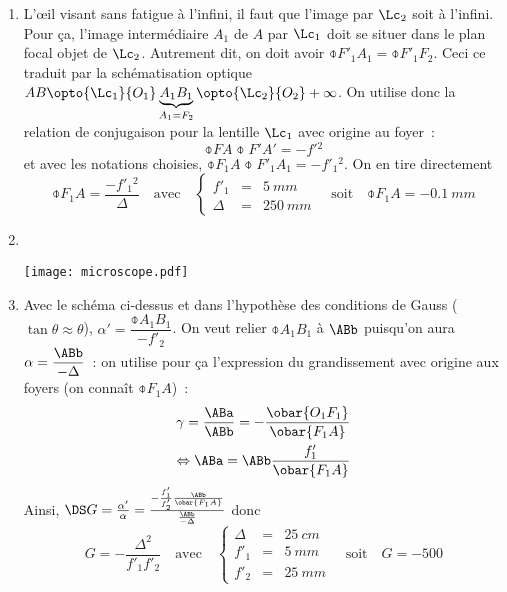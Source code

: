 \documentclass[a4paper, 12pt, final, garamond]{book}
\begin{document}
\begin{enumerate}
    \item L'œil visant sans fatigue à l'infini, il faut que l'image par $\Lc_2$
        soit à l'infini. Pour ça, l'image intermédiaire $A_1$ de $A$ par $\Lc_1$
        doit se situer dans le plan focal objet de $\Lc_2$. Autrement dit, on
        doit avoir $\obar{F'_1A_1} = \obar{F'_1F_2}$. Ceci ce traduit par la
        schématisation optique $AB \opto{\Lc_1}{O_1} \underbrace{A_1B_1}_{A_1 =
        F_2}\opto{\Lc_2}{O_2}
        +\infty$. On utilise donc la relation de conjugaison pour la lentille
        $\Lc_1$ avec origine au foyer~:
        \begin{equation*}
            \obar{FA}\obar{F'A'} = -f'{}^2
        \end{equation*}
        et avec les notations choisies, $\obar{F_1A}\obar{F'_1A_1} = -f'_1{}^2$.
        On en tire directement
        \[\boxed{\obar{F_1A} = \frac{-f'_1{}^2}{\Delta}}
            \quad\text{avec}\quad
            \left\{
                \begin{array}{rcl}
                    f'_1 & = & \SI{5}{mm}\\
                    \Delta & = & \SI{250}{mm}
                \end{array}
            \right.
            \quad\text{soit}\quad
        \boxed{\obar{F_1A} = \SI{-0.1}{mm}}\]
    \item ~
        \begin{center}
            \texttt{[image: microscope.pdf]}
            \label{fig:microscope}
        \end{center}

    \item Avec le schéma ci-dessus et dans l'hypothèse des conditions de Gauss
        ($\tan\theta \approx \theta$), $\alpha' = \dfrac{\obar{A_1B_1}}{-f'_2}$.
        On veut relier $\obar{A_1B_1}$ à $\ABb$ puisqu'on aura $\alpha =
        \dfrac{\ABb}{-\Delta}$~: on utilise pour ça l'expression du grandissement
        avec origine aux foyers (on connaît $\obar{F_1A}$)~:
        \begin{gather*}
            \gamma = \frac{\ABa}{\ABb} = - \frac{\obar{O_1F_1}}{\obar{F_1A}}\\
            \Leftrightarrow \ABa = \ABb \frac{f'_1}{\obar{F_1A}}
        \end{gather*}
        Ainsi, $\DS G = \frac{\alpha'}{\alpha} = \frac{- \frac{f'_1}{f'_2}
        \frac{\ABb}{\obar{F_1A}}}{ \frac{\ABb}{-\Delta}}$ donc
        \[\boxed{G = -\frac{\Delta^2}{f'_1f'_2}}
        \quad\text{avec}\quad
        \left\{
            \begin{array}{rcl}
                \Delta & = & \SI{25}{cm}\\
                f'_1 & = & \SI{5}{mm}\\
                f'_2 & = & \SI{25}{mm}
            \end{array}
        \right.\quad\text{soit}\quad
        \boxed{G=-500}\]

\end{enumerate}
\end{document}
